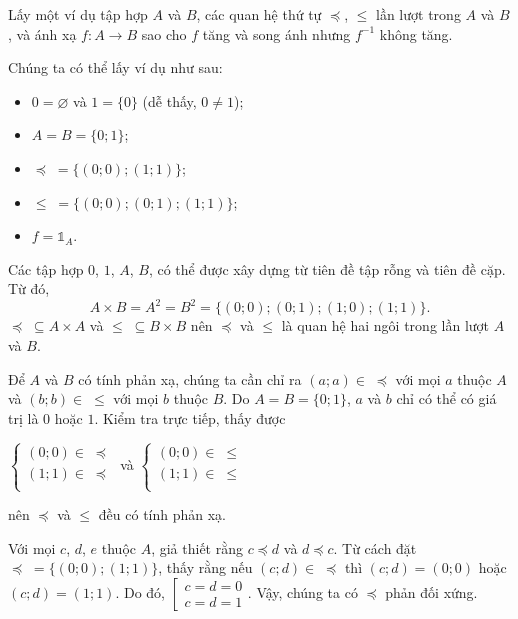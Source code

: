 \exercise Lấy một ví dụ tập hợp $A$ và $B$, các quan hệ thứ tự $\preccurlyeq$, $\leq$ lần lượt trong $A$ và $B$, và ánh xạ $f: A \to B$ sao cho $f$ tăng và song ánh nhưng $f^{-1}$ không tăng.

\solution

Chúng ta có thể lấy ví dụ như sau:
\begin{itemize}
   \item $0 = \varnothing$ và $1 = \{0\}$ (dễ thấy, $0 \neq 1$);
   \item $A = B = \{0; 1\}$;
   \item $\preccurlyeq\;= \{(0; 0); (1; 1)\}$;
   \item $\leq\;= \{(0; 0); (0; 1); (1; 1)\}$;
   \item $f = \mathds{1}_A$.
\end{itemize}

Các tập hợp $0$, $1$, $A$, $B$, có thể được xây dựng từ tiên đề tập rỗng và tiên đề cặp. Từ đó, $$
A \times B = A^2 = B^2 = \{(0; 0); (0; 1); (1; 0); (1; 1)\}.
$$
$\preccurlyeq\;\subseteq A \times A$ và $\leq\;\subseteq B \times B$ nên $\preccurlyeq$ và $\leq$ là quan hệ hai ngôi trong lần lượt $A$ và $B$.

Để $A$ và $B$ có tính phản xạ, chúng ta cần chỉ ra $(a; a) \in \; \preccurlyeq$ với mọi $a$ thuộc $A$ và $(b; b) \in\;\leq$ với mọi $b$ thuộc $B$. Do $A = B = \{0; 1\}$, $a$ và $b$ chỉ có thể có giá trị là $0$ hoặc $1$. Kiểm tra trực tiếp, thấy được 
\begin{center}
   $\begin{cases}
      (0; 0) \in\;\preccurlyeq \\
      (1; 1) \in\;\preccurlyeq \\
   \end{cases}$ và $
   \begin{cases}
      (0; 0) \in\;\leq \\
      (1; 1) \in\;\leq \\
   \end{cases}$
\end{center}
nên $\preccurlyeq$ và $\leq$ đều có tính phản xạ.

Với mọi $c$, $d$, $e$ thuộc $A$, giả thiết rằng $c \preccurlyeq d$ và $d \preccurlyeq c$. Từ cách đặt $\preccurlyeq\;= \{(0; 0); (1; 1)\}$, thấy rằng nếu $(c; d) \in\;\preccurlyeq$ thì $(c; d) = (0; 0)$ hoặc $(c; d) = (1; 1)$. Do đó, $\left[\begin{aligned}
   c = d = 0 \\
   c = d = 1
\end{aligned}\right.$. Vậy, chúng ta có $\preccurlyeq$ phản đối xứng.

